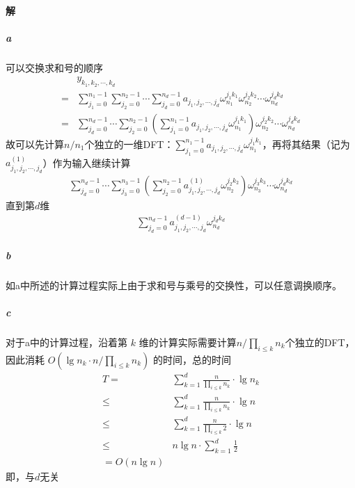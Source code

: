 \documentclass{article}
\begin{document}
\paragraph{解}
\subparagraph{a}
可以交换求和号的顺序
\begin{align*}
	&y_{k_1, k_2, \cdots, k_d} \\
	=& \sum_{j_1 = 0}^{n_1 - 1}\sum_{j_2 = 0}^{n_2 - 1} \cdots \sum_{j_d = 0}^{n_d - 1}{a_{j_1,j_2,\cdots,j_d} \omega_{n_1}^{j_1 k_1}\omega_{n_2}^{j_2 k_2} \cdots \omega_{n_d}^{j_d k_d}} \\
	=& \sum_{j_d = 0}^{n_d - 1} \cdots \sum_{j_2 = 0}^{n_2 - 1} {\left( \sum_{j_1 = 0}^{n_1 - 1}{a_{j_1,j_2,\cdots,j_d} \omega_{n_1}^{j_1 k_1}} \right) \omega_{n_2}^{j_2 k_2} \cdots \omega_{n_d}^{j_d k_d}}
\end{align*}
故可以先计算$n/n_1$个独立的一维DFT：$\displaystyle \sum_{j_1 = 0}^{n_1 - 1}{a_{j_1,j_2,\cdots,j_d} \omega_{n_1}^{j_1 k_1}}$，再将其结果（记为$a_{j_1,j_2,\cdots,j_d}^{(1)}$）作为输入继续计算
\begin{align*}
	\sum_{j_d = 0}^{n_d - 1} \cdots \sum_{j_3 = 0}^{n_3 - 1} {\left( \sum_{j_2 = 0}^{n_2 - 1}{a_{j_1,j_2,\cdots,j_d}^{(1)} \omega_{n_2}^{j_2 k_2}} \right) \omega_{n_3}^{j_3 k_3} \cdots \omega_{n_d}^{j_d k_d}}
\end{align*}
直到第$d$维
\begin{align*}
	\sum_{j_d = 0}^{n_d - 1}{a_{j_1,j_2,\cdots,j_d}^{(d - 1)} \omega_{n_d}^{j_d k_d}}
\end{align*}

\subparagraph{b}
如a中所述的计算过程实际上由于求和号与乘号的交换性，可以任意调换顺序。

\subparagraph{c}
对于a中的计算过程，沿着第 $k$ 维的计算实际需要计算$\displaystyle n \Bigg/ \prod_{i \leq k}{n_k} $个独立的DFT，因此消耗 $O\left( \lg{n_k}  \cdot \displaystyle n \Bigg/ \prod_{i \leq k}{n_k} \right)$ 的时间，总的时间
\begin{align*}
	T =& \sum_{k = 1}^d{\frac{n}{\displaystyle\prod_{i \leq k}{n_k}} \cdot \lg{n_k}} \\
	\leq& \sum_{k = 1}^d{\frac{n}{\displaystyle\prod_{i \leq k}{n_k}} \cdot \lg{n}} \\
	\leq& \sum_{k = 1}^d{\frac{n}{\displaystyle\prod_{i \leq k}{2}} \cdot \lg{n}} \\
	\leq& n \lg{n} \cdot \sum_{k = 1}^d{\frac{1}{2}} \\
	= O(n \lg{n})
\end{align*}
即，与$d$无关
\end{document}
